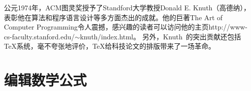 
\begin{abstract}
\noindent  %
这是一个简单的Xe\LaTeX{}+CJK的模板，为\TeX{}的初学者提供便利上手的参照。该模板在Win7+Xe\LaTeX{}下编译通过，适合在Windows下工作的朋友。从一个简单的模板出发，不断地提升对\TeX{}的认识，培养良好的写作风格。网上有大量的资料，我推荐\LaTeX{}编辑部，那里能找到国内外许多期刊的模板和一些高校博/硕士论文的模板。祝玩儿得开心！
\end{abstract}

\PencilRightUp %
公元1974年，ACM图灵奖授予了Standford大学教授Donald E. Knuth（高德纳），表彰他在算法和程序语言设计等多方面杰出的成就。他的巨著The Art of Computer Programming令人震撼，感兴趣的读者可以访问他的主页http://www-cs-faculty.stanford.edu/$\sim$knuth/index.html。
另外，Knuth~的突出贡献还包括\TeX{}系统，毫不夸张地评价，\TeX{}给科技论文的排版带来了一场革命。

\section{编辑数学公式}


